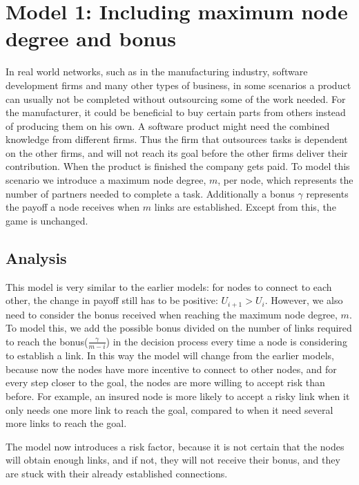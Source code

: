 

\section{Model 1: Including maximum node degree and bonus}
In real world networks, such as in the manufacturing industry, software development firms and many other types of business, in some scenarios a product can usually not be completed without outsourcing some of the work needed. For the manufacturer, it could be beneficial to buy certain parts from others instead of producing them on his own. A software product might need the combined knowledge from different firms. Thus the firm that outsources tasks is dependent on the other firms, and will not reach its goal before the other firms deliver their contribution. When the product is finished the company gets paid.
To model this scenario we introduce a maximum node degree, $m$, per node, which represents the number of partners needed to complete a task. Additionally a bonus $\gamma$ represents the payoff a node receives when $m$ links are established. Except from this, the game is unchanged.
\subsection{Analysis}
This model is very similar to the earlier models: for nodes to connect to each other, the change in payoff still has to be positive: $U_{i+1} > U_{i}$. However, we also need to consider the bonus received when reaching the maximum node degree, $m$. 
To model this, we add the possible bonus divided on the number of links required to reach the bonus($\frac{\gamma}{m-i}$) in the decision process every time a node is considering to establish a link. 
In this way the model will change from the earlier models, because now the nodes have more incentive to connect to other nodes, and for every step closer to the goal, the nodes are more willing to accept risk than before. For example, an insured node is more likely to accept a risky link when it only needs one more link to reach the goal, compared to when it need several more links to reach the goal.

 The model now introduces a risk factor, because it is not certain that the nodes will obtain enough links, and if not, they will not receive their bonus, and they are stuck with their already established connections. 

